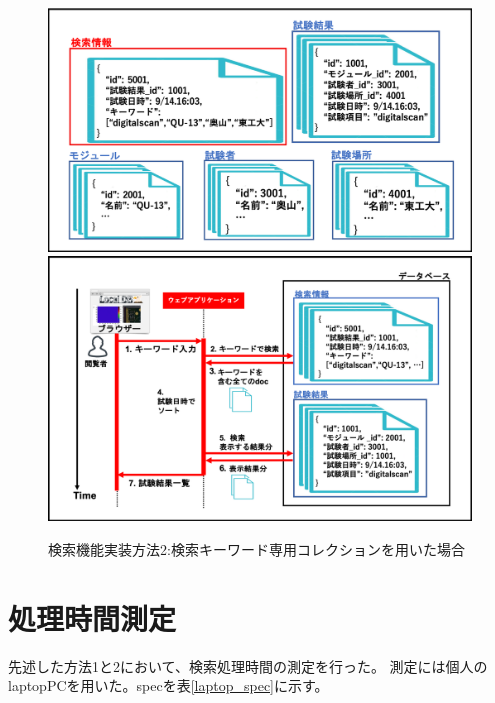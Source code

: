 \begin{figure}[bpt]
  \begin{center}
    \includegraphics[width=16cm]{search_mongo_collection}
    \includegraphics[width=16cm]{search_mongo_collection_flow}
  \caption[検索機能実装方法2:検索キーワード専用コレクションを用いた場合]{検索機能実装方法2:検索キーワード専用コレクションを用いた場合}
  \label{search_mongo_collection}
  \end{center}
\end{figure}

\section{処理時間測定}
先述した方法1と2において、検索処理時間の測定を行った。
測定には個人のlaptopPCを用いた。specを表\ref{laptop_spec}に示す。

\begin{table}[tbp]
\caption[laptopの性能]{laptopの性能}
\label{laptop_spec}
\end{table}

